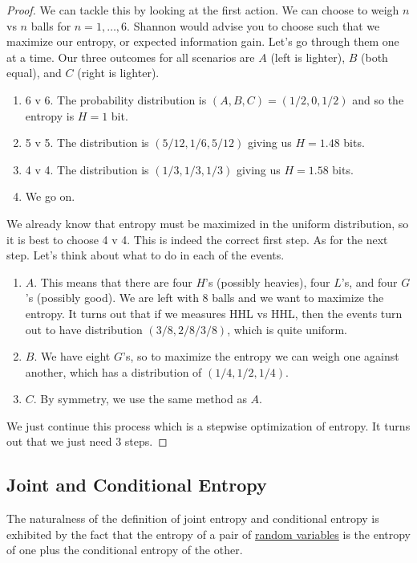     \begin{proof}
      We can tackle this by looking at the first action. We can choose to weigh $n$ vs $n$ balls for $n = 1, \ldots, 6$. Shannon would advise you to choose such that we maximize our entropy, or expected information gain. Let's go through them one at a time. Our three outcomes for all scenarios are $A$ (left is lighter), $B$ (both equal), and $C$ (right is lighter). 
      \begin{enumerate}
        \item 6 v 6. The probability distribution is $(A, B, C) = (1/2, 0, 1/2)$ and so the entropy is $H = 1$ bit. 
        \item 5 v 5. The distribution is $(5/12, 1/6, 5/12)$ giving us $H = 1.48$ bits. 
        \item 4 v 4. The distribution is $(1/3, 1/3, 1/3)$ giving us $H = 1.58$ bits. 
        \item We go on. 
      \end{enumerate}
      We already know that entropy must be maximized in the uniform distribution, so it is best to choose 4 v 4. This is indeed the correct first step. As for the next step. Let's think about what to do in each of the events. 
      \begin{enumerate}
        \item $A$. This means that there are four $H$'s (possibly heavies), four $L$'s, and four $G$'s (possibly good). We are left with 8 balls and we want to maximize the entropy. It turns out that if we measures HHL vs HHL, then the events turn out to have distribution $(3/8, 2/8/ 3/8)$, which is quite uniform.  
        \item $B$. We have eight $G$'s, so to maximize the entropy we can weigh one against another, which has a distribution of $(1/4, 1/2, 1/4)$. 
        \item $C$. By symmetry, we use the same method as $A$. 
      \end{enumerate}
      We just continue this process which is a stepwise optimization of entropy. It turns out that we just need 3 steps. 
    \end{proof}

  \subsection{Joint and Conditional Entropy}

    The naturalness of the definition of joint entropy and conditional entropy is exhibited by the fact that the entropy of a pair of \hyperref[prob-def:random-variable]{random variables} is the entropy of one plus the conditional entropy of the other. 

